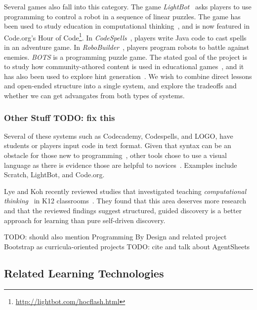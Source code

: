 \documentclass{sig-alternate}
\newcommand{\TODO}[1]{{\color{red} TODO: #1}}
\begin{document}
Several games also fall into this category.
The game \emph{LightBot}~\cite{lightbot} asks players to use programming to control a robot in a sequence of linear puzzles.
The game has been used to study education in computational thinking~\cite{Gouws13Lightbot}, and is now featured in Code.org's Hour of Code\footnote{\url{http://lightbot.com/hocflash.html}}.
In \emph{CodeSpells}~\cite{esper2013codespells}, players write Java code to cast spells in an adventure game.
In \emph{RoboBuilder}~\cite{weintrop2012robobuilder}, players program robots to battle against enemies.
\emph{BOTS} is a programming puzzle game. The stated goal of the project is to study how community-athored content is used in educational games~\cite{hickspart14}, and it has also been used to explore hint generation~\cite{peddycord14generating}.
We wish to combine direct lessons and open-ended structure into a single system, and explore the tradeoffs and whether we can get advangates from both types of systems.

\subsubsection{Other Stuff \TODO{fix this}}
Several of these systems such as Codecademy, Codespells, and LOGO, have students or players input code in text format.
Given that syntax can be an obstacle for those new to programming~\cite{stefik2013syntax}, other tools chose to use a visual language as there is evidence those are helpful to novices~\cite{whitley1997visual}. Examples include Scratch, LightBot, and Code.org.

Lye and Koh recently reviewed studies that investigated teaching \emph{computational thinking}~\cite{wing2008computational} in K12 classrooms~\cite{lye2014review}.
They found that this area deserves more research and that
the reviewed findings suggest structured, guided discovery is a better approach for learning than pure self-driven discovery.

\TODO{should also mention Programming By Design and related project Bootstrap as curricula-oriented projects}
\TODO{cite and talk about AgentSheets}

\subsection{Related Learning Technologies}
\end{document}
